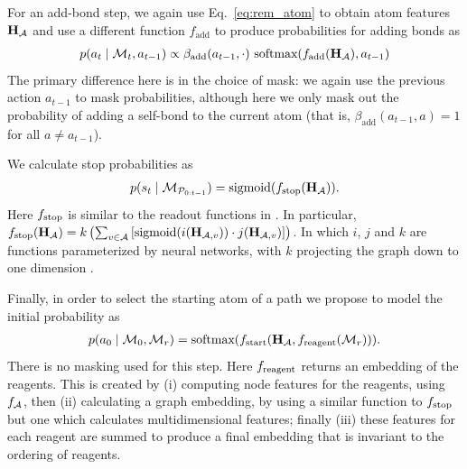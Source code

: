For an add-bond step, we again use Eq.~\eqref{eq:rem_atom} to obtain atom features ${\mathbf{H}}_{{\mathcal{A}}}$ and use a different function $f_{\textrm{add}}$ to produce probabilities for adding bonds as 
\begin{align}
p(a_t \mid {\mathcal{M}}_t, a_{t-1}) \propto \beta_{\mathrm{add}}(a_{t-1}, \cdot) \ \mbox{softmax}(f_{\textrm{add}}({\mathbf{H}}_{{\mathcal{A}}}), a_{t-1})
 \end{align}
The primary difference here is in the choice of mask:
we again use the previous action $a_{t-1}$ to mask probabilities, 
although here we only mask out the probability of adding a self-bond to the current atom
(that is, $\beta_{\mathrm{add}}(a_{t-1}, a) = 1$ for all $a \neq a_{t-1}$).

 We calculate stop probabilities as 
\begin{align}
p(s_t \mid {\mathcal{M}}_{{\mathcal{P}}_{0:t-1}} ) = \mbox{sigmoid}(f_{\textrm{stop}}({\mathbf{H}}_{{\mathcal{A}}})).
\end{align}
Here $f_{\textrm{stop}}$ is similar to the readout functions in \citet[eq. 4]{gilmer2017neural}. In particular,
$f_{\textrm{stop}}({\mathbf{H}}_{{\mathcal{A}}}) = k \left( \sum_{v \in {\mathcal{A}}} \left[ \mbox{sigmoid}(i({\mathbf{H}}_{{\mathcal{A}},v})) \cdot j({\mathbf{H}}_{{\mathcal{A}},v}) \right] \right)$.
In which $i$, $j$ and $k$ are functions parameterized by neural networks, with $k$ projecting the graph down to one dimension .

Finally, in order to select the starting atom of a path we propose to model the initial probability as 
\begin{align}
p(a_0 \mid {\mathcal{M}}_0, {\mathcal{M}}_r) = \mbox{softmax}(f_{\textrm{start}}({\mathbf{H}}_{{\mathcal{A}}}, f_{\textrm{reagent}}({\mathcal{M}}_r))).
\end{align}
There is no masking used for this step. 
Here $f_{\textrm{reagent}}$ returns an embedding of the reagents.
This is created by (i) computing node features for the reagents, using $f_{{\mathcal{A}}}$, then (ii) calculating a graph embedding, by using a similar function to $f_{\textrm{stop}}$ but one which calculates multidimensional features;
finally (iii) these features for each reagent are summed  to produce a final embedding that is invariant to the ordering of reagents.

